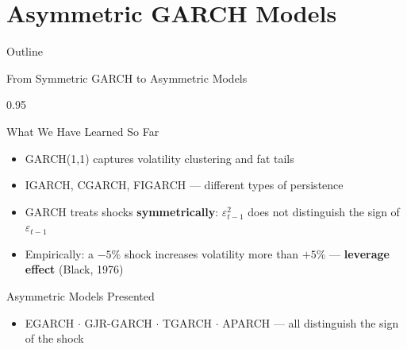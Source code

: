 \documentclass[9pt, aspectratio=169, t]{beamer}
\begin{document}
\section{Asymmetric GARCH Models}

\begin{frame}{Outline}
    \small
    \vspace{-0.2cm}
    \tableofcontents[currentsection]
\end{frame}

\begin{frame}{From Symmetric GARCH to Asymmetric Models}
    \begin{cminipage}{0.95\textwidth}
    {\footnotesize
        \begin{block}{What We Have Learned So Far}
            \begin{itemize}\setlength{\itemsep}{0pt}
                \item GARCH(1,1) captures volatility clustering and fat tails
                \item IGARCH, CGARCH, FIGARCH --- different types of persistence
            \end{itemize}
        \end{block}
        \vspace{-0.15cm}
        \begin{rmk}
            \begin{itemize}\setlength{\itemsep}{0pt}
                \item GARCH treats shocks \textbf{symmetrically}: $\varepsilon_{t-1}^2$ does not distinguish the sign of $\varepsilon_{t-1}$
                \item Empirically: a $-5\%$ shock increases volatility more than $+5\%$ --- \textbf{leverage effect} (Black, 1976)
            \end{itemize}
        \end{rmk}
        \vspace{-0.15cm}
        \begin{exampleblock}{Asymmetric Models Presented}
            \begin{itemize}\setlength{\itemsep}{0pt}
                \item EGARCH $\cdot$ GJR-GARCH $\cdot$ TGARCH $\cdot$ APARCH --- all distinguish the sign of the shock
            \end{itemize}
        \end{exampleblock}
    }
    \end{cminipage}
\end{frame}
\end{document}
